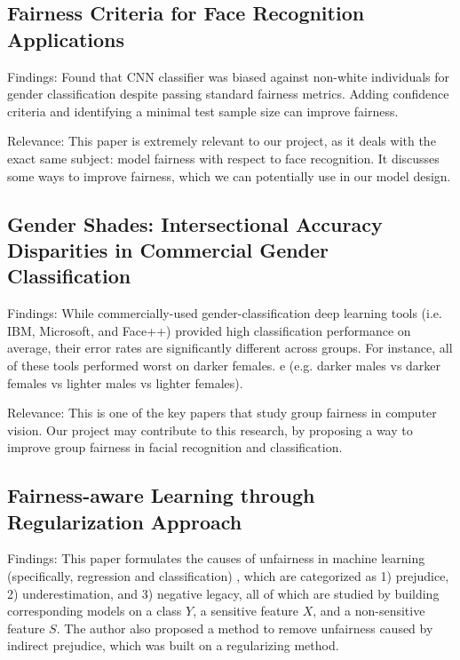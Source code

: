 \documentclass{article}
\begin{document}
\subsection{Fairness Criteria for Face Recognition Applications \cite{michalsky2019fair}}

Findings: Found that CNN classifier was biased against non-white individuals for gender classification despite passing standard fairness metrics. Adding confidence criteria and identifying a minimal test sample size can improve fairness.

\noindent Relevance: This paper is extremely relevant to our project, as it deals with the exact same subject: model fairness with respect to face recognition. It discusses some ways to improve fairness, which we can potentially use in our model design.

\subsection{Gender Shades: Intersectional Accuracy Disparities in Commercial Gender Classification \cite{buolamwini2018gendershades}}

Findings: While commercially-used gender-classification deep learning tools (i.e. IBM, Microsoft, and Face++) provided high classification performance on average, their error rates are significantly different across groups.  For instance, all of these tools performed worst on darker females. e  (e.g. darker males vs darker females vs lighter males vs lighter females). 


\noindent Relevance: This is one of the key papers that study group fairness in computer vision.   Our project may contribute to this research, by proposing a way to improve group fairness in facial recognition and classification.


\subsection{Fairness-aware Learning through Regularization Approach \cite{6137441}}
Findings: This paper formulates the causes of unfairness in machine learning (specifically, regression and classification) , which are categorized as 1) prejudice, 2) underestimation,  and 3) negative legacy, all of which are studied by building corresponding models on a class $Y$, a sensitive feature $X$, and a non-sensitive feature $S$. The author also proposed a method to remove unfairness caused by indirect prejudice, which was built on a regularizing method.
\end{document}

